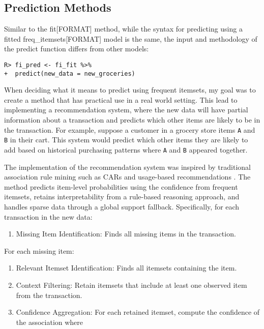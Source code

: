 \documentclass[
  article]{jss}
\providecommand{\tightlist}{%
  \setlength{\itemsep}{0pt}\setlength{\parskip}{0pt}}\usepackage{longtable,booktabs,array}
\begin{document}
\subsection{Prediction Methods}\label{prediction-methods}

Similar to the fit{[}FORMAT{]} method, while the syntax for predicting
using a fitted freq\_itemsets{[}FORMAT{]} model is the same, the input
and methodology of the predict function differs from other
 models:

\begin{verbatim}
R> fi_pred <- fi_fit %>%
+  predict(new_data = new_groceries)
\end{verbatim}

When deciding what it means to predict using frequent itemsets, my goal
was to create a method that has practical use in a real world setting.
This lead to implementing a recommendation system, where the new data
will have partial information about a transaction and predicts which
other items are likely to be in the transaction. For example, suppose a
customer in a grocery store items \texttt{A} and \texttt{B} in their
cart. This system would predict which other items they are likely to add
based on historical purchasing patterns where \texttt{A} and \texttt{B}
appeared together.

The implementation of the recommendation system was inspired by
traditional association rule mining such as CARs
\citep{liu_integrating_1998} and usage-based recommendations
\citep{mobasher_effective_2001}. The method predicts item-level
probabilities using the confidence from frequent itemsets, retains
interpretability from a rule-based reasoning approach, and handles
sparse data through a global support fallback. Specifically, for each
transaction in the new data:

\begin{enumerate}
\def\labelenumi{\arabic{enumi}.}
\tightlist
\item
  Missing Item Identification: Finds all missing items in the
  transaction.
\end{enumerate}

For each missing item:

\begin{enumerate}
\def\labelenumi{\arabic{enumi}.}
\item
  Relevant Itemset Identification: Finds all itemsets containing the
  item.
\item
  Context Filtering: Retain itemsets that include at least one observed
  item from the transaction.
\item
  Confidence Aggregation: For each retained itemset, compute the
  confidence of the association where
\end{enumerate}
\end{document}
